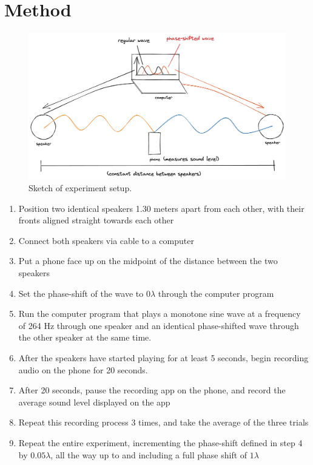 \documentclass[index]{subfiles}
\begin{document}
\section{Method}

\begin{figure}[H]
    \centering
    \includegraphics[scale=0.22]{res/sound_diagram.png}
    \caption{Sketch of experiment setup.}
\end{figure}

\begin{enumerate}
    \item Position two identical speakers 1.30 meters apart from each other, with their fronts aligned straight towards each other
    \item Connect both speakers via cable to a computer
    \item Put a phone face up on the midpoint of the distance between the two speakers
    \item Set the phase-shift of the wave to \(0\lambda\) through the computer program
    \item Run the computer program that plays a monotone sine wave at a frequency of 264 Hz through one speaker and an identical phase-shifted wave through the other speaker at the same time.
    \item After the speakers have started playing for at least 5 seconds, begin recording audio on the phone for 20 seconds.
    \item After 20 seconds, pause the recording app on the phone, and record the average sound level displayed on the app
    \item Repeat this recording process 3 times, and take the average of the three trials
    \item Repeat the entire experiment, incrementing the phase-shift defined in step 4 by \(0.05\lambda\), all the way up to and including a full phase shift of \(1\lambda\)
\end{enumerate}
\end{document}

